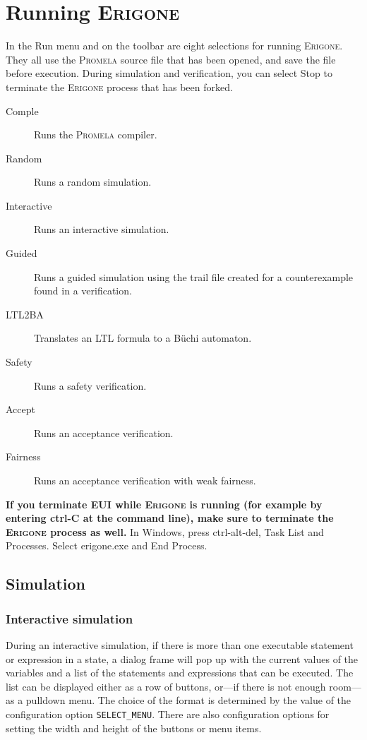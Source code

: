 \documentclass[11pt]{article}
\newcommand{\eri}{\textsc{Erigone}}
\newcommand{\prm}{\textsc{Promela}}
\newcommand{\eui}{\textsc{EUI}}
\newcommand{\p}[1]{\texttt{#1}}
\newcommand{\bu}[1]{\textsf{#1}}
\begin{document}
\section{Running \eri{}}\label{s.run}
In the \bu{Run} menu and on the toolbar are eight selections for
running \eri{}. They all use the \prm{} source file that has been opened,
and save the file before execution.
During simulation and verification,
you can select \bu{Stop} to terminate the \eri{} process that has been forked.
\begin{description}
\item[\bu{Comple}] Runs the \prm{} compiler.
\item[\bu{Random}] Runs a random simulation.
\item[\bu{Interactive}] Runs an interactive simulation.
\item[\bu{Guided}] Runs a guided simulation using the trail
file created for a counterexample found in a verification.
\item[\bu{LTL2BA}] Translates an LTL formula to a B\"{u}chi automaton.
\item[\bu{Safety}] Runs a safety verification.
\item[\bu{Accept}] Runs an acceptance verification.
\item[\bu{Fairness}] Runs an acceptance verification with weak fairness.
\end{description}

\textbf{If you terminate \eui{} while \eri{} is running (for example by
entering \bu{ctrl-C} at the command line), make sure to terminate the
\eri{} process as well.} In Windows, press \bu{ctrl-alt-del}, \bu{Task
List} and \bu{Processes}. Select \bu{erigone.exe} and \bu{End Process}.

\subsection{Simulation}\label{s.sim}

\subsubsection{Interactive simulation}

During an interactive simulation, if there is more than one executable
statement or expression in a state, a dialog frame will pop up with the
current values of the variables and a list of the statements and
expressions that can be executed. The list can be displayed either as a
row of buttons, or---if there is not enough room---as a pulldown menu.
The choice of the format is determined by the value of the configuration
option \p{SELECT\_MENU}. There are also configuration options for
setting the width and height of the buttons or menu items.
\end{document}
